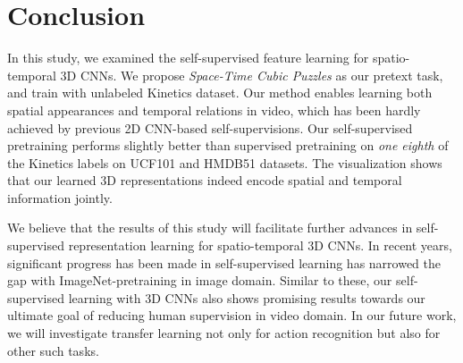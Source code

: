 \documentclass[letterpaper]{article} \usepackage{aaai19}  \usepackage{times}  \usepackage{helvet}  \usepackage{courier}  \usepackage{url}  \usepackage{graphicx}  \frenchspacing  \setlength{\pdfpagewidth}{8.5in}  \setlength{\pdfpageheight}{11in}
\begin{document}
\section{Conclusion}
In this study, we examined the self-supervised feature learning for spatio-temporal 3D CNNs. We propose \textit{Space-Time Cubic Puzzles} as our pretext task, and train with unlabeled Kinetics dataset. Our method enables learning both spatial appearances and temporal relations in video, which has been hardly achieved by previous 2D CNN-based self-supervisions. Our self-supervised pretraining performs slightly better than supervised pretraining on \textit{one eighth} of the Kinetics labels on UCF101 and HMDB51 datasets. The visualization shows that our learned 3D representations indeed encode spatial and temporal information jointly.

We believe that the results of this study will facilitate further advances in self-supervised representation learning for spatio-temporal 3D CNNs. In recent years, significant progress has been made in self-supervised learning has narrowed the gap with ImageNet-pretraining in image domain. Similar to these, our self-supervised learning with 3D CNNs also shows promising results towards our ultimate goal of reducing human supervision in video domain. In our future work, we will investigate transfer learning not only for action recognition but also for other such tasks.

{
	 
	
}
\end{document}
